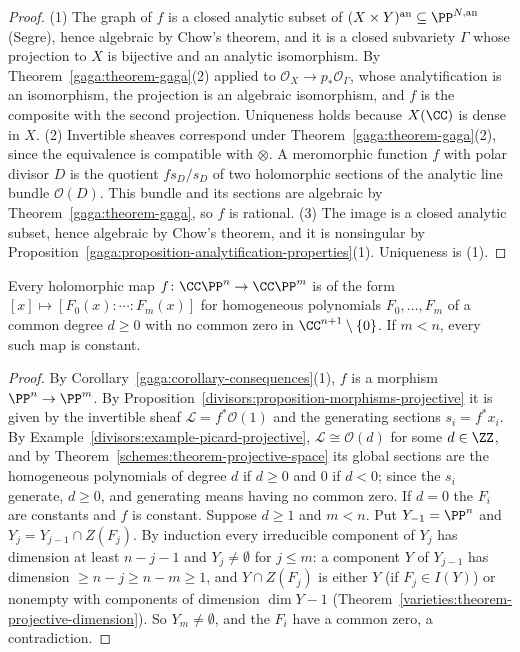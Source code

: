 \begin{proof}
(1) The graph of $f$ is a closed analytic subset of $(X \times Y)^{\mathrm{an}} \subseteq \PP^{N,\mathrm{an}}$ (Segre), hence algebraic by Chow's theorem, and it is a
closed subvariety $\Gamma$ whose projection to $X$ is bijective and an analytic isomorphism. By Theorem~\ref{gaga:theorem-gaga}(2) applied to
$\mathcal{O}_X \to p_*\mathcal{O}_\Gamma$, whose analytification is an isomorphism, the projection is an algebraic isomorphism, and $f$ is the composite with the second
projection. Uniqueness holds because $X(\CC)$ is dense in $X$. (2) Invertible sheaves correspond under Theorem~\ref{gaga:theorem-gaga}(2), since the equivalence is
compatible with $\otimes$. A meromorphic function $f$ with polar divisor $D$ is the quotient $fs_D/s_D$ of two holomorphic sections of the analytic line bundle
$\mathcal{O}(D)$. This bundle and its sections are algebraic by Theorem~\ref{gaga:theorem-gaga}, so $f$ is rational. (3) The image is a closed analytic
subset, hence algebraic by Chow's theorem, and it is nonsingular by Proposition~\ref{gaga:proposition-analytification-properties}(1). Uniqueness is (1).
\end{proof}

\begin{corollary}\label{gaga:corollary-maps-projective-spaces}
Every holomorphic map $f \colon \CC\PP^n \to \CC\PP^m$ is of the form $[x] \mapsto [F_0(x) : \cdots : F_m(x)]$ for homogeneous polynomials $F_0, \ldots, F_m$ of a common degree $d \geq 0$ with no common zero in
$\CC^{n+1} \setminus \{0\}$. If $m < n$, every such map is constant.
\end{corollary}

\begin{proof}
By Corollary~\ref{gaga:corollary-consequences}(1), $f$ is a morphism $\PP^n \to \PP^m$. By Proposition~\ref{divisors:proposition-morphisms-projective} it is given by the invertible sheaf $\mathcal{L} = f^*\mathcal{O}(1)$ and the
generating sections $s_i = f^*x_i$. By Example~\ref{divisors:example-picard-projective}, $\mathcal{L} \cong \mathcal{O}(d)$ for some $d \in \ZZ$, and by Theorem~\ref{schemes:theorem-projective-space} its global
sections are the homogeneous polynomials of degree $d$ if $d \geq 0$ and $0$ if $d < 0$; since the $s_i$ generate, $d \geq 0$, and generating means having no common zero. If $d = 0$ the $F_i$ are constants and $f$ is constant.
Suppose $d \geq 1$ and $m < n$. Put $Y_{-1} = \PP^n$ and $Y_j = Y_{j-1} \cap Z(F_j)$. By induction every irreducible component of $Y_j$ has dimension at least $n - j - 1$ and $Y_j \neq \emptyset$ for $j \leq m$: a component $Y$ of
$Y_{j-1}$ has dimension $\geq n - j \geq n - m \geq 1$, and $Y \cap Z(F_j)$ is either $Y$ (if $F_j \in I(Y)$) or nonempty with components of dimension $\dim Y - 1$ (Theorem~\ref{varieties:theorem-projective-dimension}).
So $Y_m \neq \emptyset$, and the $F_i$ have a common zero, a contradiction.
\end{proof}

